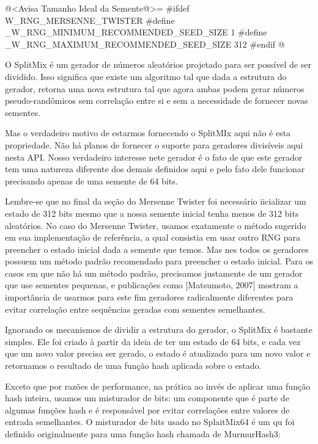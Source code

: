 \iniciocodigo
@<Avisa Tamanho Ideal da Semente@>=
#ifdef W_RNG_MERSENNE_TWISTER
#define _W_RNG_MINIMUM_RECOMMENDED_SEED_SIZE  1
#define _W_RNG_MAXIMUM_RECOMMENDED_SEED_SIZE  312
#endif
@
\fimcodigo


O SplitMix é um gerador de números aleatórios projetado para ser
possível de ser dividido. Isso significa que existe um algoritmo tal
que dada a estrutura do gerador, retorna uma nova estrutura tal que
agora ambas podem gerar números pseudo-randômicos sem correlação entre
si e sem a necessidade de fornecer novas sementes.

Mas o verdadeiro motivo de estarmos fornecendo o SplitMIx aqui não é
esta propriedade. Não há planos de fornecer o suporte para geradores
divisíveis aqui nesta API. Nosso verdadeiro interesse nete gerador é o
fato de que este gerador tem uma natureza diferente dos demais
definidos aqui e pelo fato dele funcionar precisando apenas de uma
semente de 64 bits.

Lembre-se que no final da seção do Mersenne Twister foi necessário
iicializar um estado de 312 bits mesmo que a nossa semente inicial
tenha menos de 312 bits aleatórios. No caso do Mersenne Twister,
usamos exatamente o método sugerido em sua implementação de
referência, a qual consistia em usar outro RNG para preencher o estado
inicial dada a semente que temos. Mas nes todos os geradores possuem
um método padrão recomendado para preencher o estado inicial. Para os
casos em que não há um método padrão, precisamos justamente de um
gerador que use sementes pequenas, e publicações como [Matsumoto,
2007] mostram a importância de usarmos para este fim geradores
radicalmente diferentes para evitar correlação entre sequências
geradas com sementes semelhantes.

Ignorando os mecanismos de dividir a estrutura do gerador, o SplitMix
é bastante simples. Ele foi criado à partir da ideia de ter um estado
de 64 bits, e cada vez que um novo valor precisa ser gerado, o estado
é atualizado para um novo valor e retornamos o resultado de uma função
hash aplicada sobre o estado.

Exceto que por razões de performance, na prática ao invés de aplicar
uma função hash inteira, usamos um misturador de bits: um componente
que é parte de algumas funções hash e é responsável por evitar
correlações entre valores de entrada semelhantes. O misturador de bits
usado no SplaitMix64 é um qu foi definido originalmente para uma
função hash chamada de MurmurHash3:

